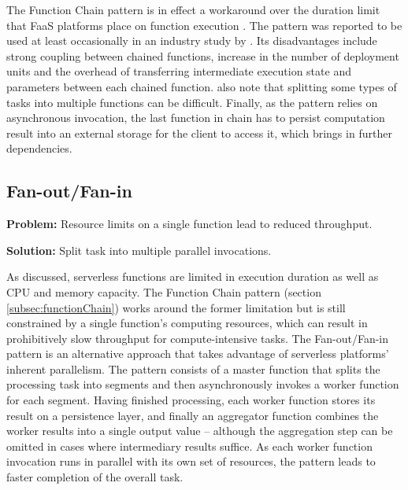 The Function Chain pattern is in effect a workaround over the duration limit that FaaS platforms place on function execution \parencite{leitner18industrialpractice}. The pattern was reported to be used at least occasionally in an industry study by \textcite{leitner18industrialpractice}. Its disadvantages include strong coupling between chained functions, increase in the number of deployment units and the overhead of transferring intermediate execution state and parameters between each chained function. \textcite{leitner18industrialpractice} also note that splitting some types of tasks into multiple functions can be difficult. Finally, as the pattern relies on asynchronous invocation, the last function in chain has to persist computation result into an external storage for the client to access it, which brings in further dependencies.

\subsection{Fan-out/Fan-in} \label{subsec:FanoutFanin}

\textbf{Problem:} Resource limits on a single function lead to reduced throughput.


\textbf{Solution:} Split task into multiple parallel invocations.

As discussed, serverless functions are limited in execution duration as well as CPU and memory capacity. The Function Chain pattern (section \ref{subsec:functionChain}) works around the former limitation but is still constrained by a single function's computing resources, which can result in prohibitively slow throughput for compute-intensive tasks. The Fan-out/Fan-in pattern is an alternative approach that takes advantage of serverless platforms' inherent parallelism. The pattern consists of a master function that splits the processing task into segments and then asynchronously invokes a worker function for each segment. Having finished processing, each worker function stores its result on a persistence layer, and finally an aggregator function combines the worker results into a single output value -- although the aggregation step can be omitted in cases where intermediary results suffice. As each worker function invocation runs in parallel with its own set of resources, the pattern leads to faster completion of the overall task. \parencite{zambrano18patterns}

